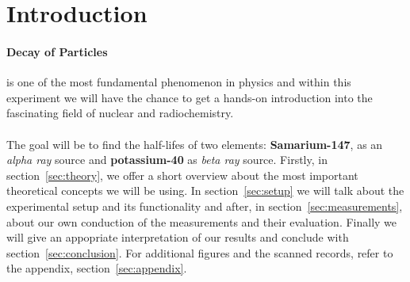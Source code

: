\section{Introduction}
\label{sec:introduction}
\paragraph{Decay of Particles} is one of the most fundamental phenomenon
in physics and within this experiment we will have the chance
to get a hands-on introduction into the fascinating field of nuclear and radiochemistry. \\\\ 
The goal will be to find the half-lifes of two elements: \textbf{Samarium-147}, as an \textit{alpha ray}
source and \textbf{potassium-40} as \textit{beta ray} source. Firstly, in section~\ref{sec:theory}, 
we offer a short overview about the most important theoretical concepts we will be using.
In section~\ref{sec:setup} we will talk about the experimental setup and its 
functionality and after, in section~\ref{sec:measurements}, about our
own conduction of the measurements and their evaluation. Finally
we will give an appopriate interpretation of our results and conclude with
section~\ref{sec:conclusion}. For additional figures and the scanned records,
refer to the appendix, section~\ref{sec:appendix}.
